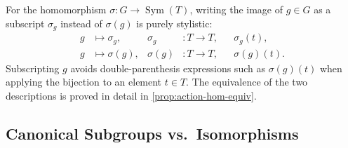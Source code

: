 \begin{content}
For the homomorphism $\sigma \colon G \to \operatorname{Sym}(T)$, writing the image of $g \in G$ as a subscript $\sigma_g$ instead of $\sigma(g)$ is purely stylistic:
\begin{align*}
g &\mapsto \sigma_g, & \sigma_g &\colon T \to T, & &\sigma_g(t), \\
g &\mapsto \sigma(g), & \sigma(g) &\colon T \to T, & &\sigma(g)(t).
\end{align*}
Subscripting $g$ avoids double-parenthesis expressions such as $\sigma(g)(t)$ when applying the bijection to an element $t \in T$. The equivalence of the two descriptions is proved in detail in \cref{prop:action-hom-equiv}.
\end{content}

\begin{hidden}
\end{hidden}

\subsection{Canonical Subgroups vs.\ Isomorphisms}

